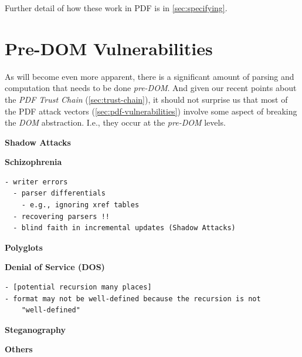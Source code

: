 Further detail of how these work in PDF is in \cref{sec:specifying}.

\section{Pre-DOM Vulnerabilities }
\label{sec:predom-vulnerabilities}

As will become even more apparent, there is a significant amount of
parsing and computation that needs to be done \emph{pre-DOM}.
And given our recent points about the \emph{PDF Trust Chain}
(\cref{sec:trust-chain}),
it should not surprise us that most of the PDF attack vectors
(\cref{sec:pdf-vulnerabilities})
involve some aspect of breaking the \emph{DOM} abstraction.
I.e., they occur at the \emph{pre-DOM} levels.

{\bf{Shadow Attacks}} 

{\bf{Schizophrenia}} 
\begin{lstlisting}[style=meta]
  - writer errors
  - parser differentials
    - e.g., ignoring xref tables
  - recovering parsers !!
  - blind faith in incremental updates (Shadow Attacks)
\end{lstlisting}

{\bf{Polyglots}} 

{\bf{Denial of Service (DOS)}} 
%
\begin{lstlisting}[style=meta]
- [potential recursion many places]
- format may not be well-defined because the recursion is not
    "well-defined"
\end{lstlisting}

{\bf{Steganography}} 

{\bf{Others}} 
